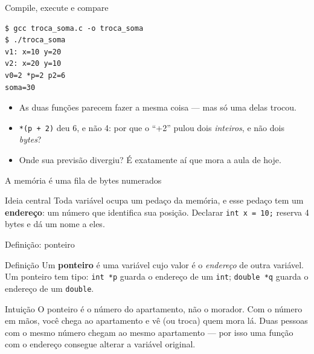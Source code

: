 \documentclass[aspectratio=169]{beamer}
\begin{document}
\begin{frame}[fragile]{Compile, execute e compare}
\begin{lstlisting}[language={}, numbers=none, basicstyle=\ttfamily\small]
$ gcc troca_soma.c -o troca_soma
$ ./troca_soma
v1: x=10 y=20
v2: x=20 y=10
v0=2 *p=2 p2=6
soma=30
\end{lstlisting}
  \begin{itemize}
    \item As duas funções parecem fazer a mesma coisa --- mas só uma delas trocou.
    \item \texttt{*(p + 2)} deu 6, e não 4: por que o ``+2'' pulou dois
      \emph{inteiros}, e não dois \emph{bytes}?
    \item Onde sua previsão divergiu? É exatamente aí que mora a aula de hoje.
  \end{itemize}
\end{frame}

\begin{frame}{A memória é uma fila de bytes numerados}
  \begin{center}
  \end{center}
  \begin{block}{Ideia central}
    Toda variável ocupa um pedaço da memória, e esse pedaço tem um
    \textbf{endereço}: um número que identifica sua posição. Declarar
    \texttt{int x = 10;} reserva 4 bytes e dá um nome a eles.
  \end{block}
\end{frame}

\begin{frame}{Definição: ponteiro}
  \begin{block}{Definição}
    Um \textbf{ponteiro} é uma variável cujo valor é o \emph{endereço} de
    outra variável. Um ponteiro tem tipo: \texttt{int *p} guarda o endereço
    de um \texttt{int}; \texttt{double *q} guarda o endereço de um
    \texttt{double}.
  \end{block}
  \begin{exampleblock}{Intuição}
    O ponteiro é o número do apartamento, não o morador. Com o número em
    mãos, você chega ao apartamento e vê (ou troca) quem mora lá. Duas
    pessoas com o mesmo número chegam ao mesmo apartamento --- por isso uma
    função com o endereço consegue alterar a variável original.
  \end{exampleblock}
\end{frame}
\end{document}
